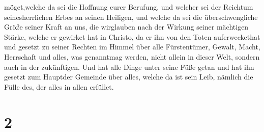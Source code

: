 möget,welche da sei die Hoffnung eurer Berufung, und welcher sei der
Reichtum seinesherrlichen Erbes an seinen Heiligen,  und
welche da sei die überschwengliche Größe seiner Kraft an uns, die
wirglauben nach der Wirkung seiner mächtigen Stärke, 
welche er gewirket hat in Christo, da er ihn von den Toten
auferweckethat und gesetzt zu seiner Rechten im Himmel 
über alle Fürstentümer, Gewalt, Macht, Herrschaft und alles, was
genanntmag werden, nicht allein in dieser Welt, sondern auch in der
zukünftigen.  Und hat alle Dinge unter seine Füße getan und
hat ihn gesetzt zum Hauptder Gemeinde über alles,  welche
da ist sein Leib, nämlich die Fülle des, der alles in allen erfüllet.

\hypertarget{section-1}{%
\section{2}\label{section-1}}

